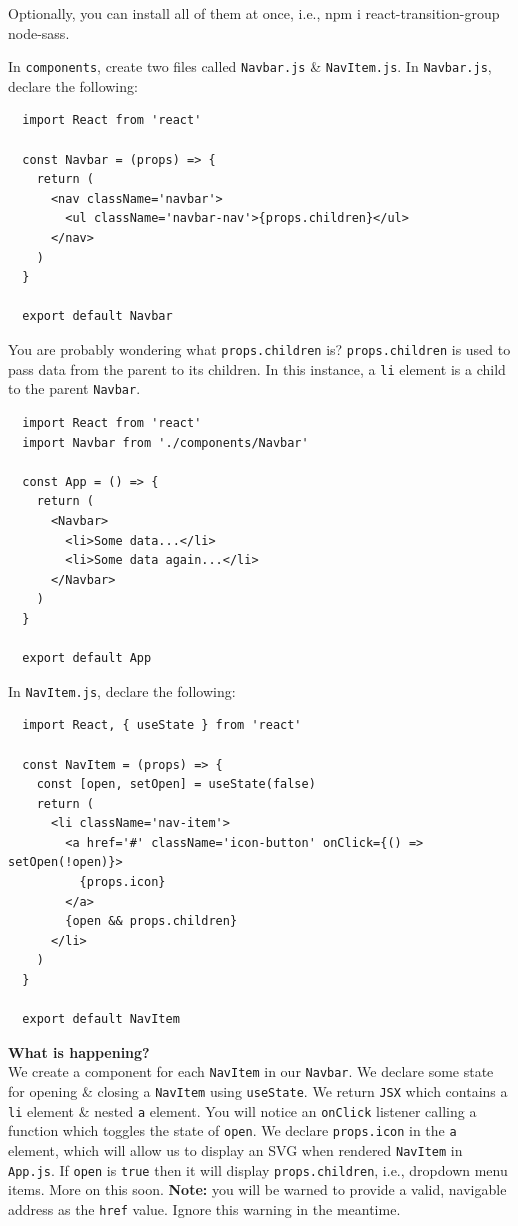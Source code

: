 \documentclass{article}
\begin{document}
Optionally, you can install all of them at once, i.e., npm i react-transition-group node-sass.

In \texttt{components}, create two files called \texttt{Navbar.js} \& \texttt{NavItem.js}. In \texttt{Navbar.js}, declare the following:
\begin{verbatim}
  import React from 'react'

  const Navbar = (props) => {
    return (
      <nav className='navbar'>
        <ul className='navbar-nav'>{props.children}</ul>
      </nav>
    )
  }

  export default Navbar
\end{verbatim}

You are probably wondering what \texttt{props.children} is? \texttt{props.children} is used to pass data from the parent to its children. In this instance, a \texttt{li} element is a child to the parent \texttt{Navbar}.

\begin{verbatim}
  import React from 'react'
  import Navbar from './components/Navbar'

  const App = () => {
    return (
      <Navbar>
        <li>Some data...</li>
        <li>Some data again...</li>
      </Navbar>
    )
  }

  export default App
\end{verbatim}

In \texttt{NavItem.js}, declare the following:
\begin{verbatim}
  import React, { useState } from 'react'

  const NavItem = (props) => {
    const [open, setOpen] = useState(false)
    return (
      <li className='nav-item'>
        <a href='#' className='icon-button' onClick={() => setOpen(!open)}>
          {props.icon}
        </a>
        {open && props.children}
      </li>
    )
  }

  export default NavItem
\end{verbatim}

\textbf{What is happening?} \\
We create a component for each \texttt{NavItem} in our \texttt{Navbar}. We declare some state for opening \& closing a \texttt{NavItem} using \texttt{useState}. We return \texttt{JSX} which contains a \texttt{li} element \& nested \texttt{a} element. You will notice an \texttt{onClick} listener calling a function which toggles the state of \texttt{open}. We declare \texttt{props.icon} in the \texttt{a} element, which will allow us to display an SVG when rendered \texttt{NavItem} in \texttt{App.js}. If \texttt{open} is \texttt{true} then it will display \texttt{props.children}, i.e., dropdown menu items. More on this soon. \textbf{Note:} you will be warned to provide a valid, navigable address as the \texttt{href} value. Ignore this warning in the meantime. \\
\end{document}

